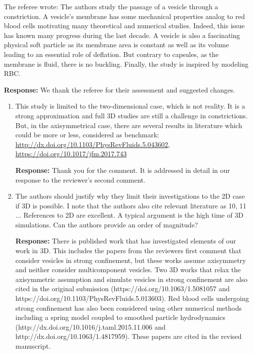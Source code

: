 \documentclass[11pt]{article}
\begin{document}
The referee wrote: The authors study the passage of a vesicle through a
constriction. A vesicle’s membrane has some mechanical properties analog
to red blood cells motivating many theoretical and numerical studies.
Indeed, this issue has known many progress during the last decade. A
vesicle is also a fascinating physical soft particle as its membrane
area is constant as well as its volume leading to an essential role of
deflation. But contrary to capsules, as the membrane is fluid, there is
no buckling. Finally, the study is inspired by modeling RBC. 

\noindent
{\bf Response:} We thank the referee for their assessment and suggested
changes.

\begin{enumerate}
\item This study is limited to the two-dimensional case, which is not
  reality. It is a strong approximation and full 3D studies are still a
    challenge in constrictions. But, in the axisymmetrical case, there
    are several results in literature which could be more or less,
    considered as benchmark:
    \url{http://dx.doi.org/10.1103/PhysRevFluids.5.043602}, \\
    \url{https://doi.org/10.1017/jfm.2017.743}

\noindent
{\bf Response:} Thank you for the comment. It is addressed in detail in
our response to the reviewer's second comment.

\item The authors should justify why they limit their investigations to
  the 2D case if 3D is possible. I note that the authors also cite
    relevant literature as 10, 11 $\ldots$ References to 2D are
    excellent. A typical argument is the high time of 3D simulations.
    Can the authors provide an order of magnitude?

\noindent
{\bf Response:} There is published work that has investigated elements
of our work in  3D. This includes the papers from the reviewers first
comment that consider vesicles in strong confinement, but these works
assume axisymmetry and neither consider multicomponent vesicles. Two 3D
works that relax the axisymmetric assumption and simulate vesicles in
strong confinement are also cited in the original submission
(https://doi.org/10.1063/1.5081057 and
https://doi.org/10.1103/PhysRevFluids.5.013603). Red blood cells
undergoing strong confinement has also been considered using other
numerical methods including a spring model coupled to smoothed particle
hydrodynamics (http://dx.doi.org/10.1016/j.taml.2015.11.006 and
http://dx.doi.org/10.1063/1.4817959). These papers are cited in the
revised manuscript.


\end{enumerate}
\end{document}
